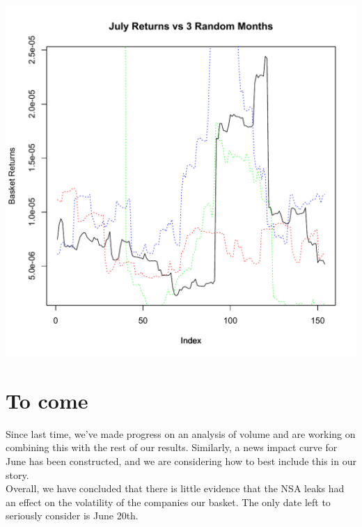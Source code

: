 \documentclass[11pt]{amsart}
\begin{document}
 \includegraphics[scale=0.5]{july_3_months.pdf} \\

\newpage
\section{To come}

Since last time, we've made progress on an analysis of volume and are working on combining this with the rest of our results. Similarly, a news impact curve for June has been constructed, and we are considering how to best include this in our story. \\

Overall, we have concluded that there is little evidence that the NSA leaks had an effect on the volatility of the companies our basket. The only date left to seriously consider is June 20th.\\
\end{document}
